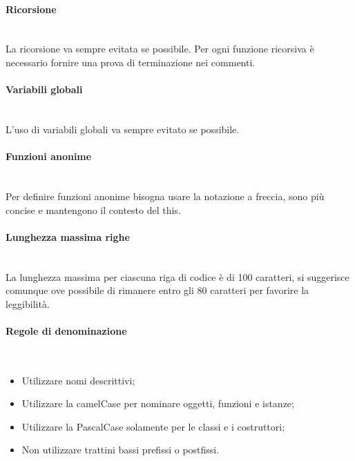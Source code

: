 \paragraph{Ricorsione}\mbox{}\\
La ricorsione va sempre evitata se possibile. Per ogni funzione ricorsiva è necessario fornire
una prova di terminazione nei commenti.

\paragraph{Variabili globali}\mbox{}\\
L'uso di variabili globali va sempre evitato se possibile.

\paragraph{Funzioni anonime}\mbox{}\\
Per definire funzioni anonime bisogna usare la notazione a freccia, sono più concise e
mantengono il contesto del {this}.

\paragraph{Lunghezza massima righe}\mbox{}\\
La lunghezza massima per ciascuna riga di codice è di 100 caratteri, si suggerisce comunque
ove possibile di rimanere entro gli 80 caratteri per favorire la leggibilità.

\paragraph{Regole di denominazione}\mbox{}\\
\begin{itemize}
\item Utilizzare nomi descrittivi;
\item Utilizzare la camelCase per nominare oggetti, funzioni e istanze;
\item Utilizzare la PascalCase solamente per le classi e i costruttori;
\item Non utilizzare trattini bassi prefissi o postfissi.
\end{itemize}

